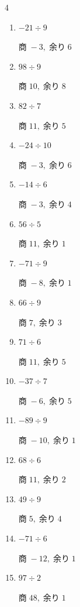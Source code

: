 \begin{multicols}{4}
\begin{enumerate}
  \item $-21 \div 9$

        $商\; -3,\; 余り\; 6$

\columnbreak %

  \item $98 \div 9$

        $商\; 10,\; 余り\; 8$

  \item $82 \div 7$

        $商\; 11,\; 余り\; 5$

  \item $-24 \div 10$

        $商\; -3,\; 余り\; 6$

  \item $-14 \div 6$

        $商\; -3,\; 余り\; 4$

  \item $56 \div 5$

        $商\; 11,\; 余り\; 1$

  \item $-71 \div 9$

        $商\; -8,\; 余り\; 1$

  \item $66 \div 9$

        $商\; 7,\; 余り\; 3$

  \item $71 \div 6$

        $商\; 11,\; 余り\; 5$

  \item $-37 \div 7$

        $商\; -6,\; 余り\; 5$

  \item $-89 \div 9$

        $商\; -10,\; 余り\; 1$

  \item $68 \div 6$

        $商\; 11,\; 余り\; 2$

  \item $49 \div 9$

        $商\; 5,\; 余り\; 4$

  \item $-71 \div 6$

        $商\; -12,\; 余り\; 1$

  \item $97 \div 2$

        $商\; 48,\; 余り\; 1$


\end{enumerate}
\end{multicols}
